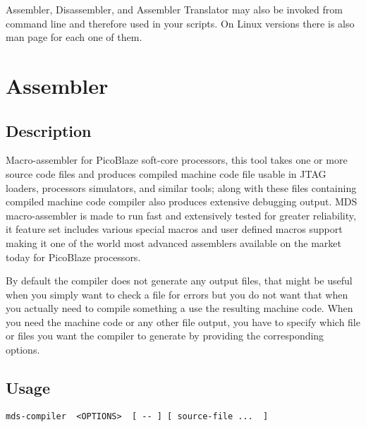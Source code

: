 Assembler, Disassembler, and Assembler Translator may also be invoked from command line and therefore used in your scripts. On Linux versions there is also man page for each one of them.

\section{Assembler}
    \subsection{Description}
        Macro-assembler for PicoBlaze soft-core processors, this tool takes one or more source code files and produces compiled machine code file usable in JTAG loaders, processors simulators, and similar tools; along with these files containing compiled machine code compiler also produces extensive debugging output. MDS macro-assembler is made to run fast and extensively tested for greater reliability, it feature set includes various special macros and user defined macros support making it one of the world most advanced assemblers available on the market today for PicoBlaze processors.

        By default the compiler does not generate any output files, that might be useful when you simply want to check a file for errors but you do not want that when you actually need to compile something a use the resulting machine code. When you need the machine code or any other file output, you have to specify which file or files you want the compiler to generate by providing the corresponding options.

    \subsection{Usage}
        \verb'mds-compiler  <OPTIONS>  [ -- ] [ source-file ...  ]'


